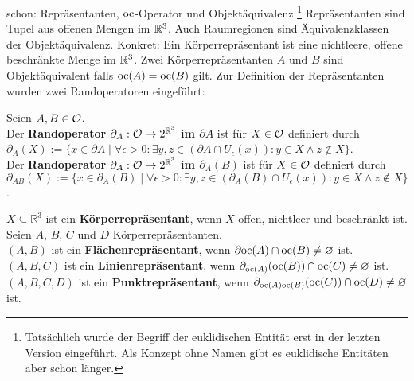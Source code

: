    schon: Repräsentanten, $\text{oc}$-Operator und Objektäquivalenz
    \footnote{Tatsächlich wurde der Begriff der euklidischen Entität erst in der letzten Version eingeführt. Als Konzept ohne Namen gibt es euklidische Entitäten aber schon länger.}
    Repräsentanten sind Tupel aus offenen Mengen im $\mathbb{R}^3$.
    Auch Raumregionen sind Äquivalenzklassen der Objektäquivalenz.
    Konkret: Ein Körperrepräsentant ist eine nichtleere, offene beschränkte Menge im $\mathbb{R}^3$.
    Zwei Körperrepräsentanten $A$ und $B$ sind Objektäquivalent falls $\text{oc}(A) = \text{oc}(B)$ gilt.
    Zur Definition der Repräsentanten wurden zwei Randoperatoren eingeführt:
    \begin{dfn}[Randoperatoren] 
    		Seien $A, B \in \mathcal{O} $. \\
    		Der \textbf{Randoperator $\partial_A : \mathcal{O} \to 2^{\mathbb{R}^3}$ im $\partial A$} ist für $X \in \mathcal{O}$ definiert durch \\ $\partial_A(X) := \{x \in \partial A \mid \forall \epsilon > 0 : \exists y, z \in (\partial A \cap U_\epsilon (x)) : y \in X \land z \notin X\} $. \\
    		Der \textbf{Randoperator $\partial_{A} : \mathcal{O} \to 2^{\mathbb{R}^3}$ im $\partial_A(B)$} ist für $X \in \mathcal{O}$ definiert durch \\ $\partial_{AB}(X) := \{x \in \partial_A(B) \mid \forall \epsilon > 0 : \exists y, z \in (\partial_A(B) \cap U_\epsilon (x)) : y \in X \land z \notin X\} $.
    	\end{dfn}
    	
    	\begin{dfn}[Repräsentanten]
    		$X \subseteq \mathbb{R}^3$ ist ein \textbf{Körperrepräsentant}, wenn $X$ offen, nichtleer und beschränkt ist. \\
    		Seien $A$, $B$, $C$ und $D$ Körperrepräsentanten. \\
    		$(A, B)$ ist ein \textbf{Flächenrepräsentant}, wenn $\partial {\ensuremath{\text{oc}}(A)} \cap \text{oc}(B) \neq \varnothing$ ist. \\
    		$(A, B, C)$ ist ein \textbf{Linienrepräsentant}, wenn $\partial_{\text{oc}(A)}(\text{oc}(B)) \cap \text{oc}(C) \neq \varnothing$ ist. \\
    		$(A, B, C, D)$ ist ein \textbf{Punktrepräsentant}, wenn $\partial_{\text{oc}(A) \text{oc} (B)}(\text{oc} (C)) \cap \text{oc}(D) \neq \varnothing$ ist. \\	
    	\end{dfn}
    	
    	
